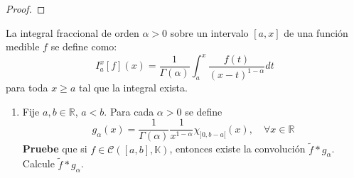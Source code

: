 \documentclass[12pt]{report}
\theoremstyle{largebreak}
\begin{document}
    \begin{proof}
        
    \end{proof}

    \begin{excer}
        La integral fraccional de orden $\alpha>0$ sobre un intervalo $[a,x]$ de una función medible $f$ se define como:
        \begin{equation*}
            I_a^x[f](x)=\frac{1}{\Gamma(\alpha)}\int_a^x\frac{f(t)}{(x-t)^{1-\alpha}}dt
        \end{equation*}
        para toda $x\geq a$ tal que la integral exista.
        \begin{enumerate}
            \item Fije $a,b\in\mathbb{R}$, $a<b$. Para cada $\alpha>0$ se define
            \begin{equation*}
                g_\alpha(x)=\frac{1}{\Gamma(\alpha)}\frac{1}{x^{1-\alpha}}\chi_{]0,b-a[}(x),\quad\forall x\in\mathbb{R}
            \end{equation*}
            \textbf{Pruebe} que si $f\in\mathcal{C}([a,b],\mathbb{K})$, entonces existe la convolución $\widetilde{f}*g_\alpha$. Calcule $\widetilde{f}*g_\alpha$.
        \end{enumerate}
    \end{excer}
\end{document}
